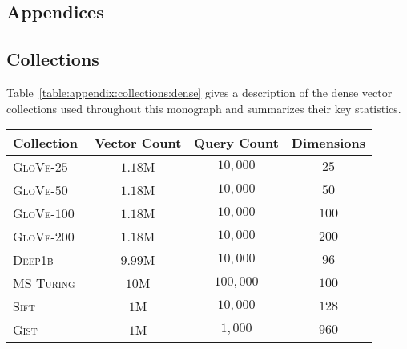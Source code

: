 \begin{partbacktext}
\part{Appendices}
\end{partbacktext}

\appendix

\chapter{Collections}
\label{appendix:collections}


\bigskip

Table~\ref{table:appendix:collections:dense} gives a description of the dense vector collections
used throughout this monograph and summarizes their key statistics.

\begin{table*}[ht]
\caption{Dense collections used in this monograph along with select statistics.}
\scriptsize
\label{table:appendix:collections:dense}
\begin{center}
\begin{sc}
\begin{tabular}{p{5cm}|ccc}
\toprule
Collection & Vector Count & Query Count & Dimensions \\
\midrule
\textsc{GloVe}-$25$~\citep{pennington-etal-2014-glove} & $1.18$M & $10{,}000$ & $25$ \\
\textsc{GloVe}-$50$ & $1.18$M & $10{,}000$ & $50$ \\
\textsc{GloVe}-$100$ & $1.18$M & $10{,}000$ & $100$ \\
\textsc{GloVe}-$200$ & $1.18$M & $10{,}000$ & $200$ \\
\textsc{Deep1b}~\citep{deep1b} & $9.99$M & $10{,}000$ & $96$ \\
\textsc{MS Turing}~\citep{msturingDataset} & $10$M & $100{,}000$ & $100$ \\
\textsc{Sift}~\citep{Lowe2004DistinctiveIF} & $1$M & $10{,}000$ & $128$ \\
\textsc{Gist}~\citep{Oliva2001ModelingTS} & $1$M & $1{,}000$ & $960$ \\
\bottomrule
\end{tabular}
\end{sc}
\end{center}
\end{table*}

